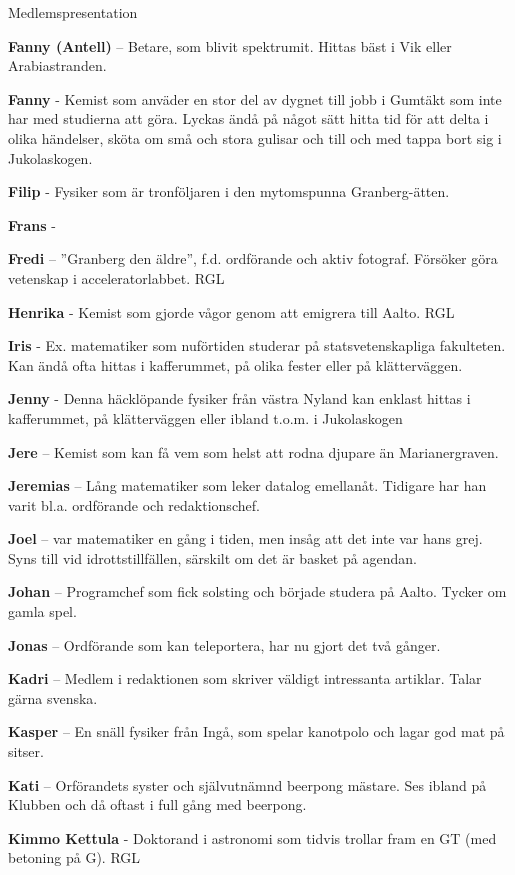 \documentclass{spektraklet}
\begin{document}
\begin{artikel}{Medlemspresentation}{}
\begin{twocolumns}
\textbf{Fanny (Antell)} – Betare, som blivit spektrumit. Hittas bäst i Vik eller Arabiastranden.

\textbf{Fanny} - Kemist som anväder en stor del av dygnet till jobb i Gumtäkt som inte har med studierna att göra. Lyckas ändå på något sätt hitta tid för att delta i olika händelser, sköta om små och stora gulisar och till och med tappa bort sig i Jukolaskogen.

\textbf{Filip} - Fysiker som är tronföljaren i den mytomspunna Granberg-ätten.

\textbf{Frans} - 

\textbf{Fredi} – ”Granberg den äldre”, f.d. ordförande och aktiv fotograf. Försöker göra vetenskap i acceleratorlabbet. RGL

\textbf{Henrika} - Kemist som gjorde vågor genom att emigrera till Aalto. RGL

\textbf{Iris} - Ex. matematiker som nuförtiden studerar på statsvetenskapliga fakulteten. Kan ändå ofta hittas i kafferummet, på olika fester eller på klätterväggen.

\textbf{Jenny} - Denna häcklöpande fysiker från västra Nyland kan enklast hittas i kafferummet, på klätterväggen eller ibland t.o.m. i Jukolaskogen

\textbf{Jere} – Kemist som kan få vem som helst att rodna djupare än Marianergraven.

\textbf{Jeremias} – Lång matematiker som leker datalog emellanåt. Tidigare har han varit bl.a. ordförande och redaktionschef.

\textbf{Joel} – var matematiker en gång i tiden, men insåg att det inte var hans grej. Syns till vid idrottstillfällen, särskilt om det är basket på agendan.

\textbf{Johan} – Programchef som fick solsting och började studera på Aalto. Tycker om gamla spel.

\textbf{Jonas} – Ordförande som kan teleportera, har nu gjort det två gånger.

\textbf{Kadri} – Medlem i redaktionen som skriver väldigt intressanta artiklar. Talar gärna svenska.

\textbf{Kasper} – En snäll fysiker från Ingå, som spelar kanotpolo och lagar god mat på sitser.

\textbf{Kati} – Orförandets syster och självutnämnd beerpong mästare. Ses ibland på Klubben och då oftast i full gång med beerpong.

\textbf{Kimmo Kettula} - Doktorand i astronomi som tidvis trollar fram en GT (med betoning på G). RGL


\end{twocolumns}
\end{artikel}
\end{document}
